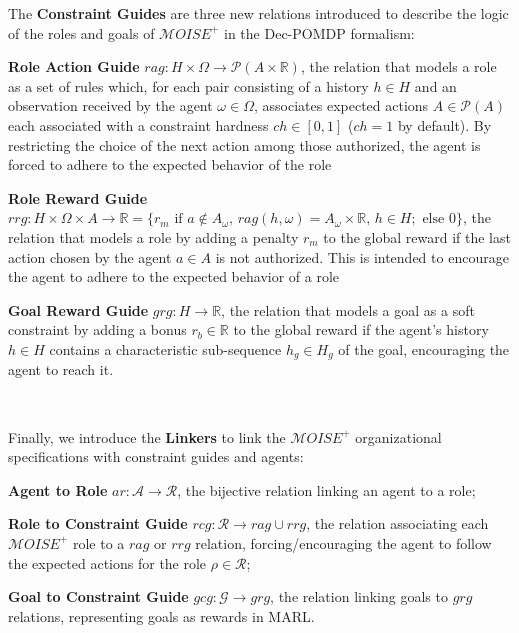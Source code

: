 \documentclass[sigconf]{aamas}
\begin{document}
\noindent The \textbf{Constraint Guides} are three new relations introduced to describe the logic of the roles and goals of $\mathcal{M}OISE^+$ in the Dec-POMDP formalism:
%
\begin{enumerate*}[label={\roman*) },itemjoin={; \quad}]

  \item \textbf{Role Action Guide} \quad $rag: H \times \Omega \rightarrow \mathcal{P}(A \times \mathbb{R})$, the relation that models a role as a set of rules which, for each pair consisting of a history $h \in H$ and an observation received by the agent $\omega \in \Omega$, associates expected actions $A \in \mathcal{P}(A)$ each associated with a constraint hardness $ch \in [0,1]$ ($ch = 1$ by default). By restricting the choice of the next action among those authorized, the agent is forced to adhere to the expected behavior of the role
  \item \textbf{Role Reward Guide} \quad $rrg: H \times \Omega \times A \to \mathbb{R} = \{r_m \text{ if } a \notin A_\omega \text{, } rag(h, \omega) \allowbreak = \allowbreak A_\omega \times \mathbb{R} \text{, } h \in H; \text{ else } 0\}$, the relation that models a role by adding a penalty $r_m$ to the global reward if the last action chosen by the agent $a \in A$ is not authorized. This is intended to encourage the agent to adhere to the expected behavior of a role
  \item \textbf{Goal Reward Guide} \quad $grg: H \rightarrow \mathbb{R}$, the relation that models a goal as a soft constraint by adding a bonus $r_b \in \mathbb{R}$ to the global reward if the agent's history $h \in H$ contains a characteristic sub-sequence $h_g \in H_g$ of the goal, encouraging the agent to reach it.
\end{enumerate*}

\

\noindent Finally, we introduce the \textbf{Linkers} to link the $\mathcal{M}OISE^+$ organizational specifications with constraint guides and agents:
%
\begin{enumerate*}[label={\roman*) },itemjoin={; \quad}]

  \item \textbf{Agent to Role} \quad $ar: \mathcal{A} \to \mathcal{R}$, the bijective relation linking an agent to a role;
  \item \textbf{Role to Constraint Guide} \quad $rcg: \mathcal{R} \rightarrow rag \cup rrg$, the relation associating each $\mathcal{M}OISE^+$ role to a $rag$ or $rrg$ relation, forcing/encouraging the agent to follow the expected actions for the role $\rho \in \mathcal{R}$;
  \item \textbf{Goal to Constraint Guide} \quad $gcg: \mathcal{G} \rightarrow grg$, the relation linking goals to $grg$ relations, representing goals as rewards in MARL.
\end{enumerate*}
\end{document}
